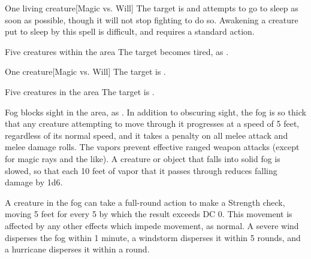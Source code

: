 \spellrng{\rngmed}
\spelldur{\durshort}
\begin{spelltarget}{One living creature}[Magic vs. Will]
    \spellsuccess The target is \fatigued and attempts to go to sleep as soon as possible, though it will not stop fighting to do so. Awakening a creature put to sleep by this spell is difficult, and requires a standard action.
\end{spelltarget}

\spelldur{\durshort}
\begin{spelltargets}{Five creatures within the area}
    \spellsuccess The target becomes tired, as .
\end{spelltargets}

\spellrng{\rngmed}
\spelldur{\durshort}
\begin{spelltarget}{One creature}[Magic vs. Will]
    \spellsuccess The target is \slowed.
\end{spelltarget}

\spelldur{\durshort}
\begin{spelltargets}{Five creatures in the area}
    \spelleffect The target is \slowed.
\end{spelltargets}

\spelldur{\durshort}
\spellline
\spelleffect Fog blocks sight in the area, as . In addition to obscuring sight, the fog is so thick that any creature attempting to move through it progresses at a speed of 5 feet, regardless of its normal speed, and it takes a  penalty on all melee attack and melee damage rolls. The vapors prevent effective ranged weapon attacks (except for magic rays and the like). A creature or object that falls into solid fog is slowed, so that each 10 feet of vapor that it passes through reduces falling damage by 1d6.
\par A creature in the fog can take a full-round action to make a Strength check, moving 5 feet for every 5 by which the result exceeds DC 0. This movement is affected by any other effects which impede movement, as normal.
\spellnotes \fogspellnotes A severe wind disperses the fog within 1 minute, a windstorm disperses it within 5 rounds, and a hurricane disperses it within a round.

